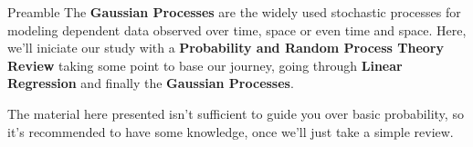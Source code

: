 \begin{frame}{Preamble} 
 The \textbf{Gaussian Processes} are the widely used stochastic processes for modeling dependent data observed over time, space or even time and space. Here, we'll iniciate our study with a \textbf{Probability and Random Process Theory Review} taking some point to base our journey, going through \textbf{Linear Regression} and finally the \textbf{Gaussian Processes}. \par
 
The material here presented isn't sufficient to guide you over basic probability, so it's recommended to have some knowledge, once we'll just take a simple review.
\end{frame}